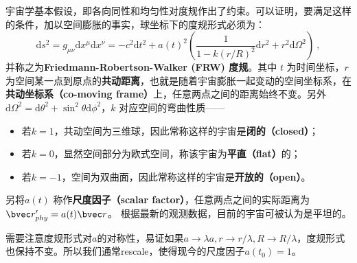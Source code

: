 
宇宙学基本假设，即各向同性和均匀性对度规作出了约束。可以证明，要满足这样的条件，加以空间膨胀的事实，球坐标下的度规形式必须为：
\begin{equation}
\mathrm{d}s^2=g_{\mu\nu}\mathrm{d}x^{\mu}\mathrm{d}x^{\nu}=-c^2\mathrm{d}t^2+a(t)^2 \left( \frac{1}{1-k(r/R)^2}\mathrm{d}r^2+r^2 \mathrm{d} \Omega^2\right)~,
\end{equation}
并称之为\textbf{Friedmann-Robertson-Walker (FRW) 度规}。其中 $t$ 为时间坐标，$r$ 为空间某一点到原点的\textbf{共动距离}，也就是随着宇宙膨胀一起变动的空间坐标系，在\textbf{共动坐标系（co-moving frame）}上，任意两点之间的距离始终不变。另外$\mathrm{d} \Omega^2 =\mathrm{d} \theta^2 + \sin^2\theta\mathrm{d} \phi^2 $，$k$ 对应空间的弯曲性质——
\begin{itemize}
\item 若$k=1$，共动空间为三维球，因此常称这样的宇宙是\textbf{闭的（closed）}；
\item 若$k=0$，显然空间部分为欧式空间，称该宇宙为\textbf{平直（flat）}的；
\item 若$k=-1$，空间为双曲面，因此常称这样的宇宙是\textbf{开放的（open）}。
\end{itemize}
 另将$a(t)$ 称作\textbf{尺度因子（scalar factor）}，任意两点之间的实际距离为$\bvec r'_{phy}=a(t)\bvec r$。
根据最新的观测数据，目前的宇宙可被认为是平坦的。

需要注意度规形式对$a$的对称性，易证如果$a\rightarrow \lambda a,r\rightarrow r/\lambda, R\rightarrow R/\lambda$，度规形式也保持不变。所以我们通常rescale，使得现今的尺度因子$a(t_0)=1$。
